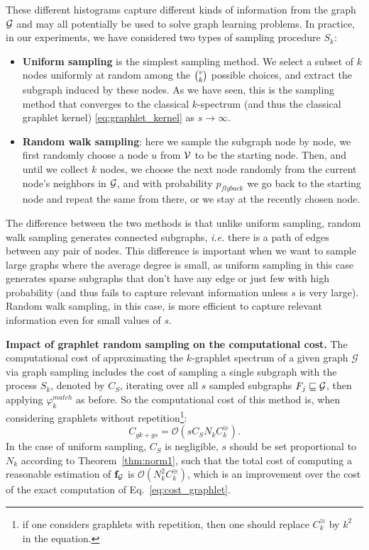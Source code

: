 These different histograms capture different kinds of information from the graph $\mathcal{G}$ and may all potentially be used to solve graph learning problems. In practice, in our experiments, we have considered two types of sampling procedure $S_k$:
\begin{itemize}
	\item \textbf{Uniform sampling} is the simplest sampling method. We select a subset of $k$ nodes uniformly at random among the $\tbinom{v}{k}$ possible choices, and extract the subgraph induced by these nodes. As we have seen, this is the sampling method that converges to the classical $k$-spectrum (and thus the classical graphlet kernel) \eqref{eq:graphlet_kernel} as $s \to \infty$.
	\item \textbf{Random walk sampling}: here we sample the subgraph node by node, we first randomly choose a node $u$ from $\mathcal{V}$ to be the starting node. Then, and until we collect $k$ nodes, we choose the next node randomly from the current node's neighbors in $\mathcal{G}$, and with probability $p_{flyback}$ we go back to the starting node and repeat the same from there, or we stay at the recently chosen node.
\end{itemize}
The difference between the two methods is that unlike uniform sampling, random walk sampling generates  connected subgraphs, \emph{i.e.} there is a path of edges between any pair of nodes. This difference is important when we want to sample large graphs where the average degree is small, as uniform sampling in this case generates sparse subgraphs that don't have any edge or just few with high probability (and thus fails to capture relevant information unless $s$ is very large). Random walk sampling, in this case, is more efficient to capture relevant information even for small values of $s$.

\noindent\textbf{Impact of graphlet random sampling on the computational cost. }
The computational cost of approximating the $k$-graphlet spectrum of a given graph $\mathcal{G}$ via graph sampling includes the cost of sampling a single subgraph with the process $S_k$, denoted by $C_S$, iterating over all $s$ sampled subgraphs $F_j\sqsubseteq \mathcal{G}$, then applying $\varphi^{match}_k$ as before. So the computational cost of this method is, when considering graphlets without repetition\footnote{if one considers graphlets with repetition, then one should replace $C^{\cong}_k$ by $k^2$ in the equation.}:
\begin{equation}
\label{eq:cost_graphlet_sampling}
C_{gk + gs}= \mathcal{O}\left(s C_S N_k C^{\cong}_k\right).
\end{equation}
In the case of uniform sampling, $C_S$ is negligible, $s$ should be set proportional to $N_k$ according to Theorem~\ref{thm:norm1}, such that the total cost of computing a reasonable estimation of $\mathbf{f}_{\mathcal{G}}$ is $\mathcal{O}\left(N_k^2 C^{\cong}_k\right)$, which is an improvement over the cost of the exact computation of Eq.~\eqref{eq:cost_graphlet}. 


